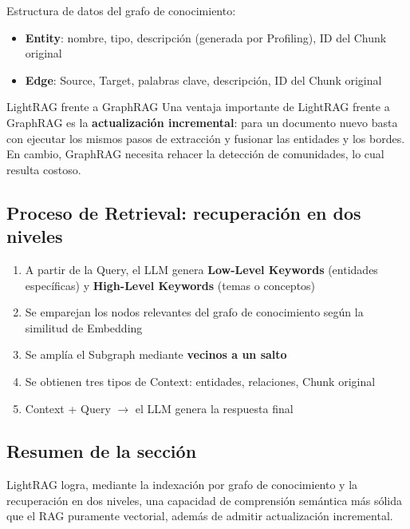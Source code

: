 Estructura de datos del grafo de conocimiento:
\begin{itemize}
    \item \textbf{Entity}: nombre, tipo, descripción (generada por Profiling), ID del Chunk original
    \item \textbf{Edge}: Source, Target, palabras clave, descripción, ID del Chunk original
\end{itemize}

\begin{knowledgebox}{LightRAG frente a GraphRAG}
Una ventaja importante de LightRAG frente a GraphRAG es la \textbf{actualización incremental}: para un documento nuevo basta con ejecutar los mismos pasos de extracción y fusionar las entidades y los bordes. En cambio, GraphRAG necesita rehacer la detección de comunidades, lo cual resulta costoso.
\end{knowledgebox}

\subsection{Proceso de Retrieval: recuperación en dos niveles}

\begin{enumerate}
    \item A partir de la Query, el LLM genera \textbf{Low-Level Keywords} (entidades específicas) y \textbf{High-Level Keywords} (temas o conceptos)
    \item Se emparejan los nodos relevantes del grafo de conocimiento según la similitud de Embedding
    \item Se amplía el Subgraph mediante \textbf{vecinos a un salto}
    \item Se obtienen tres tipos de Context: entidades, relaciones, Chunk original
    \item Context + Query $\rightarrow$ el LLM genera la respuesta final
\end{enumerate}

\subsection{Resumen de la sección}

LightRAG logra, mediante la indexación por grafo de conocimiento y la recuperación en dos niveles, una capacidad de comprensión semántica más sólida que el RAG puramente vectorial, además de admitir actualización incremental.

